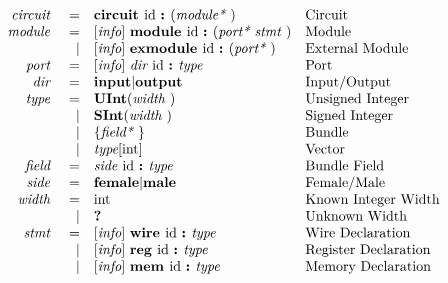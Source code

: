 \documentclass[12pt]{article}
\begin{document}
\[
\begin{array}{rrll}
\text{\em circuit\ }    &=     &\text{\bf circuit\ } \text{id } \text{\bf :\ } (\text{\em module*\ })                                        &\text{Circuit}\\
\text{\em module\ }     &=     &[\text{\em info}]\  \text{\bf module\ }  \text{id } \text{\bf :\ } (\text{\em port*\ } \text{\em stmt\ })                          &\text{Module}\\
                &\vert &[\text{\em info}]\  \text{\bf exmodule\ }  \text{id } \text{\bf :\ } (\text{\em port*\ })                                  &\text{External Module}\\
\text{\em port\ }       &=     &[\text{\em info}]\  \text{\em dir\ } \text{id } \text{\bf :\ } \text{\em type\ }                                           &\text{Port}\\
\text{\em dir\ }        &=     &\text{\bf input} \vert \text{\bf output}                                                &\text{Input/Output}\\
\text{\em type\ }       &=     &\text{\bf UInt}(\text{\em width\ })                                                        &\text{Unsigned Integer}\\
                &\vert &\text{\bf SInt}(\text{\em width\ })                                                        &\text{Signed Integer}\\
                &\vert &\{\text{\em field*\ }\}                                                         &\text{Bundle}\\
                &\vert &\text{\em type}[\text{int}]                                                             &\text{Vector}\\
\text{\em field\ }      &=     &\text{\em side\ } \text{id } \text{\bf :\ } \text{\em type\ }                                         &\text{Bundle Field}\\
\text{\em side\ }       &=     &\text{\bf female} \vert \text{\bf male}                                                 &\text{Female/Male}\\
\text{\em width\ }      &=     &\text{int}                                                                         &\text{Known Integer Width}\\
                &\vert &\text{\bf ?\ }                                                                        &\text{Unknown Width}\\
\text{\em stmt\ }       &=     &[\text{\em info}]\  \text{\bf wire\ } \text{id } \text{\bf :\ } \text{\em type\ }                                          &\text{Wire Declaration}\\
                &\vert &[\text{\em info}]\  \text{\bf reg\ } \text{id } \text{\bf :\ } \text{\em type\ }                                           &\text{Register Declaration}\\
                &\vert &[\text{\em info}]\  \text{\bf mem\ } \text{id } \text{\bf :\ } \text{\em type\ }                                           &\text{Memory Declaration}\\

\end{array}\]
\end{document}
